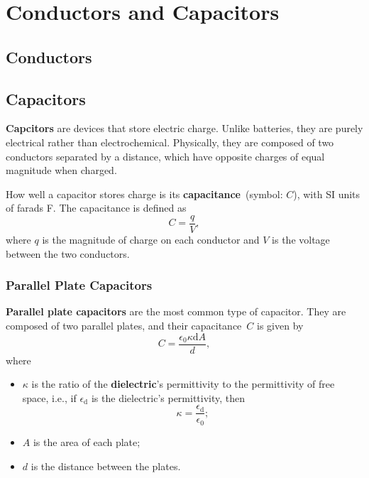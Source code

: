 \chapter{Conductors and Capacitors} \label{chap:conductors-and-capacitors}

\section{Conductors}

\section{Capacitors} \label{sec:capacitors}

\textbf{Capcitors} are devices that store electric charge.
Unlike batteries, they are purely electrical rather than electrochemical.
Physically, they are composed of two conductors separated by a distance,
which have opposite charges of equal magnitude when charged.

How well a capacitor stores charge is its \textbf{capacitance}~(symbol: \(C\)),
with SI units of farads \unit{\farad}.
The capacitance is defined as
\begin{equation} \label{eq:capacitance-def}
    C = \frac{q}{V},
\end{equation}
where \(q\) is the magnitude of charge on each conductor
and \(V\) is the voltage between the two conductors.

\subsection{Parallel Plate Capacitors}

\textbf{Parallel plate capacitors} are the most common type of capacitor.
They are composed of two parallel plates,
and their capacitance~\(C\) is given by
\begin{equation}
    C = \frac{\epsilon_0 \kappa \mathrm{d} A}{d},
\end{equation}
where
\begin{itemize}
    \item \(\kappa\) is the ratio of the \textbf{dielectric}'s permittivity
        to the permittivity of free space,
        i.e., if \(\epsilon_\mathrm{d}\) is the dielectric's permittivity,
        then
        \begin{equation}
            \kappa = \frac{\epsilon_\mathrm{d}}{\epsilon_0};
        \end{equation}
    \item \(A\) is the area of each plate;
    \item \(d\) is the distance between the plates.
\end{itemize}

